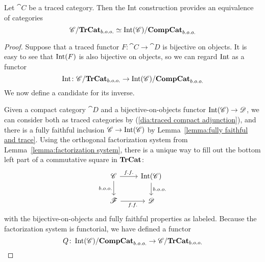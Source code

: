 \documentclass[12pt,oneside,article,draft]{memoir}
\begin{document}
\begin{proposition}
	Let $\cat{C}$ be a traced category. Then the Int construction provides an equivalence of categories
	\[
		\mathscr{C}/\mathbf{TrCat}_{b.o.o.} \simeq \operatorname{Int}(\mathscr{C})/\mathbf{CompCat}_{b.o.o.}
	\]
\end{proposition}

\begin{proof}

Suppose that a traced functor $F\colon\cat{C}\to\cat{D}$ is bijective on objects. It is easy to see that $\operatorname{Int}(F)$ is also bijective on objects, so we can regard $\operatorname{Int}$ as a functor 
$$\operatorname{Int}\colon\mathscr{C}/\mathbf{TrCat}_{b.o.o.} \to\operatorname{Int}(\mathscr{C})/\mathbf{CompCat}_{b.o.o.}$$
We now define a candidate for its inverse. 

Given a compact category $\cat{D}$ and a bijective-on-objects functor $\operatorname{Int}(\mathscr{C})\to\mathscr{D}$, we can consider both as traced categories by (\ref{dia:traced compact adjunction}), and there is a fully faithful inclusion $\mathscr{C}\to\operatorname{Int}(\mathscr{C})$ by Lemma~\ref{lemma:fully faithful and trace}. Using the orthogonal factorization system from Lemma~\ref{lemma:factorization system}, there is a unique way to fill out the bottom left part of a commutative square in $\mathbf{TrCat}$:
\begin{equation}\label{dia:factoring square}
\begin{tikzcd}
\cat{C}\arrow[r,"f.f."]\arrow[d,"b.o.o."']&\Int(\cat{C})\arrow[d,"b.o.o."]\\
\cat{F}\arrow[r,"f.f."']&\cat{D}
\end{tikzcd}
\end{equation}
with the bijective-on-objects and fully faithful properties as labeled. Because the factorization system is functorial, we have defined a functor
$$Q\colon\operatorname{Int}(\mathscr{C})/\mathbf{CompCat}_{b.o.o.}\to\mathscr{C}/\mathbf{TrCat}_{b.o.o.}$$


\end{proof}
\end{document}
